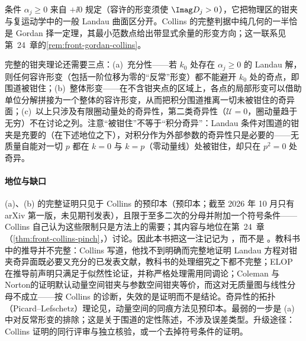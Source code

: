 条件 $\alpha_j\ge0$ 来自 $+\ii0$ 规定（容许的形变须使 $\Imag D_j>0$），它把物理区的钳夹与复运动学中的一般 Landau 曲面区分开。Collins 的完整判据\cite{Collins:2020euz}中纯几何的一半恰是 Gordan 择一定理\cite{Gordan1873}，其最小范数点给出带显式余量的形变方向；这一联系见第~24~章的\cref{rem:front-gordan-collins}。

\begin{remark}\label{rem:ir-landau-status}
完整的钳夹理论还需要三点：(a)~充分性——若 $k_0$ 处存在 $\alpha_j\ge0$ 的 Landau 解，则任何容许形变（包括一阶位移为零的“反常”形变）都不能避开 $k_0$ 处的奇点，即围道被钳住；(b)~整体形变——在不含钳夹点的区域上，各点的局部形变可以借助单位分解拼接为一个整体的容许形变，从而把积分围道推离一切未被钳住的奇异面；(c)~以上只涉及有限圈动量处的奇异性，第二类奇异性（$\mathcal U=0$，圈动量趋于无穷）不在讨论之列。注意“被钳住”不等于“积分奇异”：Landau 条件对围道的钳夹是充要的（在下述地位之下），对积分作为外部参数的奇异性只是必要的——无质量自能对一切 $p$ 都在 $k=0$ 与 $k=p$（零动量线）处被钳住，却只在 $p^2=0$ 处奇异。
\end{remark}

\paragraph{地位与缺口}
(a)、(b) 的完整证明只见于 Collins 的预印本\cite{Collins:2020euz}（预印本；截至 2026 年 10 月只有 arXiv 第一版，未见期刊发表），且限于至多二次的分母并附加一个符号条件——Collins 自己认为这些限制只是方法上的需要；其内容与地位在第~24~章（\cref{thm:front-collins-pinch}，\tagA）讨论。因此本书把这一注记记为 \tagA，而不是 \tagR。教科书中的推导并不完整：Collins 写道，他找不到明确而完整地证明 Landau 方程对钳夹奇异面既必要又充分的已发表文献，教科书的处理细究之下都不完整\cite[第~5.4.3~节，第~110~页]{Collins2011}；ELOP 在推导前声明只满足于似然性论证，并称严格处理需用同调论\cite[第~2.1~节，第~48、50~页]{EdenEtAl1966}；Coleman 与 Norton\cite{ColemanNorton1965}的证明默认动量空间钳夹与参数空间钳夹等价，而这对无质量图与线性分母不成立——按 Collins 的诊断，失效的是证明而不是结论\cite[第~IV~节、附录~D]{Collins:2020euz}。奇异性的拓扑（Picard--Lefschetz）理论见\cite{Pham:2011SingInt}，动量空间的同痕方法见预印本\cite{Muhlbauer:2020kut}。最弱的一步是 (a) 中对反常形变的排除；这是关于围道的定性陈述，不涉及误差类型。升级途径：Collins 证明的同行评审与独立核验，或一个去掉符号条件的证明。

